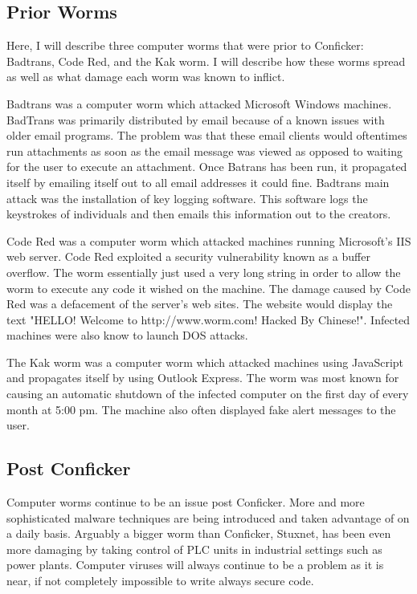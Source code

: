\documentclass[paper=a4, fontsize=11pt]{scrartcl} %
\numberwithin{equation}{section} %
\numberwithin{figure}{section} %
\numberwithin{table}{section} %
\begin{document}

\subsection{Prior Worms}
Here, I will describe three computer worms that were prior to Conficker: Badtrans, 
Code Red, and the Kak worm. I will describe how these worms spread as well as
what damage each worm was known to inflict.

Badtrans was a computer worm which attacked Microsoft Windows machines. BadTrans was
primarily distributed by email because of a known issues with older email programs.
The problem was that these email clients would oftentimes run attachments as soon
as the email message was viewed as opposed to waiting for the user to execute 
an attachment. Once Batrans has been run, it propagated itself by emailing itself out
to all email addresses it could fine. Badtrans main attack was the installation
of key logging software. This software logs the keystrokes of individuals and then
emails this information out to the creators.

Code Red was a computer worm which attacked machines running Microsoft's IIS web
server. Code Red exploited a security vulnerability known as a buffer overflow.
The worm essentially just used a very long string in order to allow the worm to
execute any code it wished on the machine. The damage caused by Code Red was a defacement
of the server's web sites. The website would display the text "HELLO! Welcome to 
http://www.worm.com! Hacked By Chinese!". Infected machines were also know to launch
DOS attacks.

The Kak worm was a computer worm which attacked machines using JavaScript and propagates
itself by using Outlook Express. The worm was most known for causing an automatic
shutdown of the infected computer on the first day of every month at 5:00 pm. The machine
also often displayed fake alert messages to the user. 



\subsection{Post Conficker}
Computer worms continue to be an issue post Conficker. More and more sophisticated
malware techniques are being introduced and taken advantage of on a daily basis. 
Arguably a bigger worm than Conficker, Stuxnet, has been even more damaging by taking
control of PLC units in industrial settings such as power plants. Computer viruses
will always continue to be a problem as it is near, if not completely impossible
to write always secure code.


\end{document}
